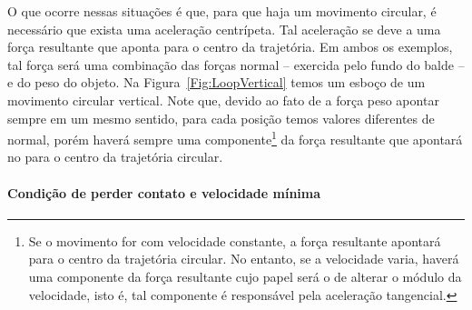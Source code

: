 O que ocorre nessas situações é que, para que haja um movimento circular, é necessário que exista uma aceleração centrípeta. Tal aceleração se deve a uma força resultante que aponta para o centro da trajetória. Em ambos os exemplos, tal força será uma combinação das forças normal -- exercida pelo fundo do balde -- e do peso do objeto. Na Figura~\ref{Fig:LoopVertical} temos um esboço de um movimento circular vertical. Note que, devido ao fato de a força peso apontar sempre em um mesmo sentido, para cada posição temos valores diferentes de normal, porém haverá sempre uma componente\footnote{Se o movimento for com velocidade constante, a força resultante apontará para o centro da trajetória circular. No entanto, se a velocidade varia, haverá uma componente da força resultante cujo papel será o de alterar o módulo da velocidade, isto é, tal componente é responsável pela aceleração tangencial.} da força resultante que apontará no para o centro da trajetória circular.

\paragraph{Condição de perder contato e velocidade mínima}


